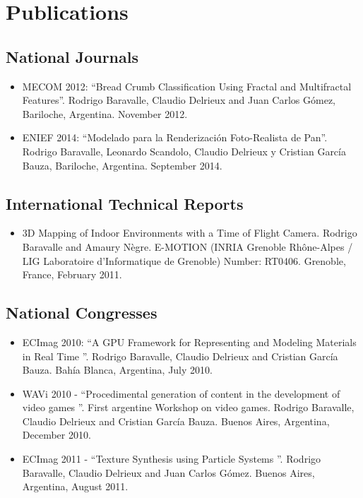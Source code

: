 \documentclass[a4paper,12pt]{article}
\begin{document}
\section*{Publications}
\subsection*{National Journals}

\begin{itemize}
\item MECOM 2012: \textquotedblleft Bread Crumb Classification Using Fractal and Multifractal Features\textquotedblright. Rodrigo Baravalle, Claudio Delrieux and Juan Carlos G\'omez, Bariloche, Argentina. November 2012.
\item ENIEF 2014: \textquotedblleft Modelado para la Renderización Foto-Realista de Pan\textquotedblright. Rodrigo Baravalle, Leonardo Scandolo, Claudio Delrieux y Cristian García Bauza, Bariloche, Argentina. September 2014.
\end{itemize}


\subsection*{International Technical Reports}
\begin{itemize}
\item 3D Mapping of Indoor Environments with a Time of Flight Camera. Rodrigo Baravalle and Amaury N\`egre. E-MOTION (INRIA Grenoble Rh\^one-Alpes /\\ LIG Laboratoire d'Informatique de Grenoble) Number: RT0406. Grenoble, France, February 2011.
\end{itemize}

\subsection*{National Congresses}
\begin{itemize}
\item ECImag 2010: \textquotedblleft A GPU Framework for Representing and Modeling Materials in Real Time \textquotedblright. Rodrigo Baravalle, Claudio Delrieux and Cristian Garc\'ia Bauza. Bahía Blanca, Argentina, July 2010.
\item WAVi 2010 - \textquotedblleft Procedimental generation of content in the development of video games \textquotedblright. First argentine Workshop on video games. Rodrigo Baravalle, Claudio Delrieux and Cristian Garc\'ia Bauza. Buenos Aires, Argentina, December 2010.
\item ECImag 2011 - \textquotedblleft Texture Synthesis using Particle Systems \textquotedblright. Rodrigo Baravalle, Claudio Delrieux and Juan Carlos G\'omez. Buenos Aires, Argentina, August 2011.
\end{itemize}
\end{document}
